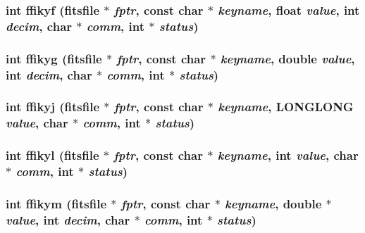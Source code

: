 \subsubsection{\setlength{\rightskip}{0pt plus 5cm}int ffikyf (\bf{fitsfile} $\ast$ {\em fptr}, const char $\ast$ {\em keyname}, float {\em value}, int {\em decim}, char $\ast$ {\em comm}, int $\ast$ {\em status})}\label{src_2fitsio_8h_ad8778b73662002f227e92cca425ce1a}


\subsubsection{\setlength{\rightskip}{0pt plus 5cm}int ffikyg (\bf{fitsfile} $\ast$ {\em fptr}, const char $\ast$ {\em keyname}, double {\em value}, int {\em decim}, char $\ast$ {\em comm}, int $\ast$ {\em status})}\label{src_2fitsio_8h_24996516801432718d31f7426d064006}


\subsubsection{\setlength{\rightskip}{0pt plus 5cm}int ffikyj (\bf{fitsfile} $\ast$ {\em fptr}, const char $\ast$ {\em keyname}, \bf{LONGLONG} {\em value}, char $\ast$ {\em comm}, int $\ast$ {\em status})}\label{src_2fitsio_8h_13613553fb1fc6a12fd7cd38c8d434bb}


\subsubsection{\setlength{\rightskip}{0pt plus 5cm}int ffikyl (\bf{fitsfile} $\ast$ {\em fptr}, const char $\ast$ {\em keyname}, int {\em value}, char $\ast$ {\em comm}, int $\ast$ {\em status})}\label{src_2fitsio_8h_a4ca40c0298931f7db20e3bc061dad32}


\subsubsection{\setlength{\rightskip}{0pt plus 5cm}int ffikym (\bf{fitsfile} $\ast$ {\em fptr}, const char $\ast$ {\em keyname}, double $\ast$ {\em value}, int {\em decim}, char $\ast$ {\em comm}, int $\ast$ {\em status})}\label{src_2fitsio_8h_304bdae48864568598985614f7d2fdac}


